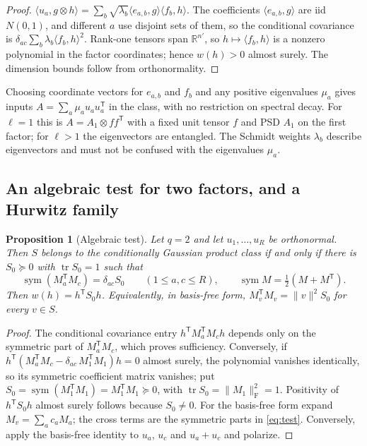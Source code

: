 \documentclass[11pt,a4paper]{article}
\newtheorem{proposition}[theorem]{Proposition}
\theoremstyle{definition}
\theoremstyle{remark}
\numberwithin{equation}{section}
\newcommand{\R}{\mathbb R}
\newcommand{\T}{{\mathsf T}}
\newcommand{\tr}{\operatorname{tr}}
\newcommand{\sym}{\operatorname{sym}}
\newcommand{\norm}[1]{\lVert#1\rVert}
\newcommand{\F}{\mathrm F}
\begin{document}
\begin{proof}
$\langle u_a,g\otimes h\rangle=\sum_b\sqrt{\lambda_b}\langle e_{a,b},g\rangle
\langle f_b,h\rangle$. The coefficients $\langle e_{a,b},g\rangle$ are iid
$N(0,1)$, and different $a$ use disjoint sets of them, so the conditional
covariance is $\delta_{ac}\sum_b\lambda_b\langle f_b,h\rangle^2$. Rank-one
tensors span $\R^{n'}$, so $h\mapsto\langle f_b,h\rangle$ is a nonzero
polynomial in the factor coordinates; hence $w(h)>0$ almost surely. The
dimension bounds follow from orthonormality.
\end{proof}

Choosing coordinate vectors for $e_{a,b}$ and $f_b$ and any positive
eigenvalues $\mu_a$ gives inputs $A=\sum_a\mu_au_au_a^\T$ in the class, with no
restriction on spectral decay. For $\ell=1$ this is $A=A_1\otimes ff^\T$ with a
fixed unit tensor $f$ and PSD $A_1$ on the first factor; for $\ell>1$ the
eigenvectors are entangled. The Schmidt weights $\lambda_b$ describe
eigenvectors and must not be confused with the eigenvalues $\mu_a$.

\subsection{An algebraic test for two factors, and a Hurwitz family}

\begin{proposition}[Algebraic test]\label{prop:test}
Let $q=2$ and let $u_1,\ldots,u_R$ be orthonormal. Then $S$ belongs to the
conditionally Gaussian product class if and only if there is $S_0\succeq0$
with $\tr S_0=1$ such that
\begin{equation}\label{eq:test}
 \sym(M_a^\T M_c)=\delta_{ac}S_0\qquad(1\le a,c\le R),
 \qquad \sym M=\tfrac12(M+M^\T).
\end{equation}
Then $w(h)=h^\T S_0h$. Equivalently, in basis-free form,
$M_v^\T M_v=\norm v^2S_0$ for every $v\in S$.
\end{proposition}

\begin{proof}
The conditional covariance entry $h^\T M_a^\T M_ch$ depends only on the
symmetric part of $M_a^\T M_c$, which proves sufficiency. Conversely, if
$h^\T(M_a^\T M_c-\delta_{ac}\,M_1^\T M_1)h=0$ almost surely, the polynomial
vanishes identically, so its symmetric coefficient matrix vanishes; put
$S_0=\sym(M_1^\T M_1)=M_1^\T M_1\succeq0$, with $\tr S_0=\norm{M_1}_\F^2=1$.
Positivity of $h^\T S_0h$ almost surely follows because $S_0\ne0$. For the
basis-free form expand $M_v=\sum_ac_aM_a$; the cross terms are the symmetric
parts in \eqref{eq:test}. Conversely, apply the basis-free identity to $u_a$,
$u_c$ and $u_a+u_c$ and polarize.
\end{proof}
\end{document}
